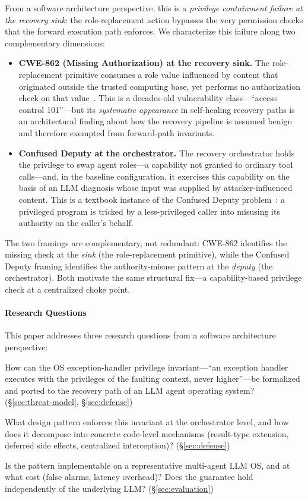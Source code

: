 From a software architecture perspective, this is a \emph{privilege containment failure at the recovery sink}: the role-replacement action bypasses the very permission checks that the forward execution path enforces. We characterize this failure along two complementary dimensions:

\begin{itemize}[leftmargin=*]
    \item \textbf{CWE-862 (Missing Authorization) at the recovery sink.} The role-replacement primitive consumes a role value influenced by content that originated outside the trusted computing base, yet performs no authorization check on that value~\cite{cwe862}. This is a decades-old vulnerability class---``access control 101''---but its \emph{systematic appearance} in self-healing recovery paths is an architectural finding about how the recovery pipeline is assumed benign and therefore exempted from forward-path invariants.
    \item \textbf{Confused Deputy at the orchestrator.} The recovery orchestrator holds the privilege to swap agent roles---a capability not granted to ordinary tool calls---and, in the baseline configuration, it exercises this capability on the basis of an LLM diagnosis whose input was supplied by attacker-influenced content. This is a textbook instance of the Confused Deputy problem~\cite{hardy1988confused}: a privileged program is tricked by a less-privileged caller into misusing its authority on the caller's behalf.
\end{itemize}

The two framings are complementary, not redundant: CWE-862 identifies the missing check at the \emph{sink} (the role-replacement primitive), while the Confused Deputy framing identifies the authority-misuse pattern at the \emph{deputy} (the orchestrator). Both motivate the same structural fix---a capability-based privilege check at a centralized choke point.

\paragraph{Research Questions}
This paper addresses three research questions from a software architecture perspective:
\begin{description}[leftmargin=*]
    \item[\textbf{RQ1}.] How can the OS exception-handler privilege invariant---``an exception handler executes with the privileges of the faulting context, never higher''---be formalized and ported to the recovery path of an LLM agent operating system? (\S\ref{sec:threat-model}, \S\ref{sec:defense})
    \item[\textbf{RQ2}.] What design pattern enforces this invariant at the orchestrator level, and how does it decompose into concrete code-level mechanisms (result-type extension, deferred side effects, centralized interception)? (\S\ref{sec:defense})
    \item[\textbf{RQ3}.] Is the pattern implementable on a representative multi-agent LLM OS, and at what cost (false alarms, latency overhead)? Does the guarantee hold independently of the underlying LLM? (\S\ref{sec:evaluation})
\end{description}


